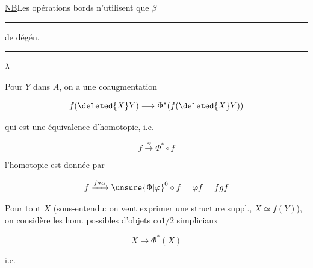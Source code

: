 \uline{NB}\quad Les opérations bords n'utilisent que \(\beta\)

\hspace{3em}\rule{4em}{0.4pt}\quad de dégén.\quad\rule{7em}{0.4pt}\(\lambda\)

Pour  \(Y\) dans \(A\), on a une coaugmentation

\[
f(\deleted{X}Y)\longrightarrow\Phi^*(f(\deleted{X}Y))
\]

qui est une \uline{équivalence d'homotopie}, i.e.

\[
f\xrightarrow{\approx}\Phi^*\circ f
\]

l'homotopie est donnée par

\[
f\xrightarrow{f*\alpha}{\unsure{\Phi|\varphi}}^0\circ f=\varphi f=fgf
\]

Pour tout \(X\) (sous-entendu: on veut exprimer une structure suppl.,   \(X\simeq f(Y)\)), on considère les hom. possibles d'objets co\(1/2\) simpliciaux

\[
X\longrightarrow\Phi^*(X)
\]


i.e.

